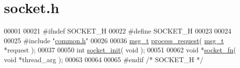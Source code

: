 \hypertarget{socket_8h_source}{}\section{socket.\+h}
\label{socket_8h_source}

\begin{DoxyCode}
00001 
00021 \textcolor{preprocessor}{#ifndef  SOCKET\_H}
00022 \textcolor{preprocessor}{#define  SOCKET\_H}
00023 
00024 
00025 \textcolor{preprocessor}{#include "\hyperlink{common_8h}{common.h}"}
00026 
00036 \hyperlink{structmsg__t}{msg\_t} \hyperlink{socket_8h_a357cff83d391e90ec9735aa38203d2e1}{process\_request}( \hyperlink{structmsg__t}{msg\_t} *request );
00037 
00050 \textcolor{keywordtype}{int} \hyperlink{socket_8h_a94c4f68644ffd04fff83f946dae4d59c}{socket\_init}( \textcolor{keywordtype}{void} );
00051 
00062 \textcolor{keywordtype}{void} *\hyperlink{socket_8h_aa92c508deb9f9da37d03c119f834f0d9}{socket\_fn}( \textcolor{keywordtype}{void} *thread\_arg );
00063 
00064 
00065 \textcolor{preprocessor}{#endif   }\textcolor{comment}{/* SOCKET\_H */}\textcolor{preprocessor}{}
\end{DoxyCode}

